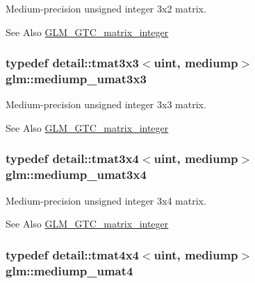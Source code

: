 Medium-\/precision unsigned integer 3x2 matrix. \begin{DoxySeeAlso}{See Also}
\hyperlink{group__gtc__matrix__integer}{G\-L\-M\-\_\-\-G\-T\-C\-\_\-matrix\-\_\-integer} 
\end{DoxySeeAlso}
\hypertarget{group__gtc__matrix__integer_ga31a05e7b2a6a596bdc7ceeb5d9c10e1c}{
\subsubsection[{mediump\-\_\-umat3x3}]{\setlength{\rightskip}{0pt plus 5cm}typedef detail\-::tmat3x3$<$uint, mediump$>$ {\bf glm\-::mediump\-\_\-umat3x3}}}\label{group__gtc__matrix__integer_ga31a05e7b2a6a596bdc7ceeb5d9c10e1c}
Medium-\/precision unsigned integer 3x3 matrix. \begin{DoxySeeAlso}{See Also}
\hyperlink{group__gtc__matrix__integer}{G\-L\-M\-\_\-\-G\-T\-C\-\_\-matrix\-\_\-integer} 
\end{DoxySeeAlso}
\hypertarget{group__gtc__matrix__integer_ga8113e067e1f327fac64cf9015c8c5431}{
\subsubsection[{mediump\-\_\-umat3x4}]{\setlength{\rightskip}{0pt plus 5cm}typedef detail\-::tmat3x4$<$uint, mediump$>$ {\bf glm\-::mediump\-\_\-umat3x4}}}\label{group__gtc__matrix__integer_ga8113e067e1f327fac64cf9015c8c5431}
Medium-\/precision unsigned integer 3x4 matrix. \begin{DoxySeeAlso}{See Also}
\hyperlink{group__gtc__matrix__integer}{G\-L\-M\-\_\-\-G\-T\-C\-\_\-matrix\-\_\-integer} 
\end{DoxySeeAlso}
\hypertarget{group__gtc__matrix__integer_gac82f1c426fbca1c4989f0985eb7a4358}{
\subsubsection[{mediump\-\_\-umat4}]{\setlength{\rightskip}{0pt plus 5cm}typedef detail\-::tmat4x4$<$uint, mediump$>$ {\bf glm\-::mediump\-\_\-umat4}}}\label{group__gtc__matrix__integer_gac82f1c426fbca1c4989f0985eb7a4358}

